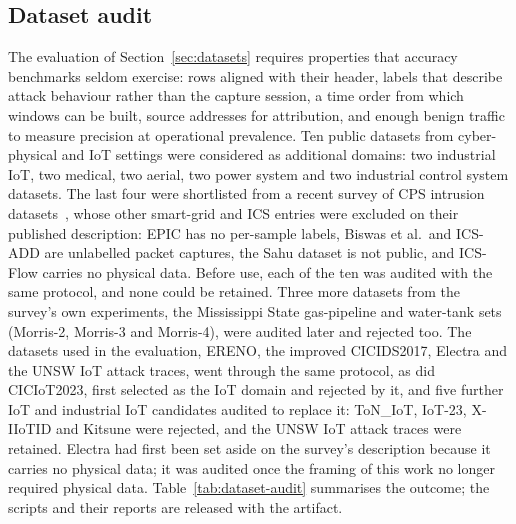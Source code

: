 \subsection{Dataset audit}
\label{sec:dataset-audit}

The evaluation of Section~\ref{sec:datasets} requires properties that accuracy
benchmarks seldom exercise: rows aligned with their header, labels that describe attack
behaviour rather than the capture session, a time order from which windows can be built,
source addresses for attribution, and enough benign traffic to measure precision at
operational prevalence. Ten public datasets from cyber-physical and IoT settings were
considered as additional domains: two industrial IoT, two medical, two aerial, two power
system and two industrial control system datasets. The last four were shortlisted from a
recent survey of CPS intrusion datasets~\cite{quincozes2025cpsdatasets}, whose other
smart-grid and ICS entries were excluded on their published description: EPIC has no
per-sample labels, Biswas et al.\ and ICS-ADD are unlabelled packet captures, the Sahu
dataset is not public, and ICS-Flow carries no physical data. Before use, each of
the ten was audited with the same protocol, and none could be retained. Three more datasets
from the survey's own experiments, the Mississippi State gas-pipeline and water-tank sets
(Morris-2, Morris-3 and Morris-4), were audited later and rejected too. The datasets used
in the evaluation, ERENO, the improved CICIDS2017, Electra and the UNSW IoT attack traces,
went through the same protocol, as did CICIoT2023, first selected as the IoT domain and
rejected by it, and five further IoT and industrial IoT candidates audited to replace it:
ToN\_IoT, IoT-23, X-IIoTID and Kitsune were rejected, and the UNSW IoT attack traces were
retained. Electra had first been set aside on
the survey's description because it carries no physical data; it was audited once the
framing of this work no longer required physical data.
Table~\ref{tab:dataset-audit} summarises the outcome; the scripts and their reports are
released with the artifact.

